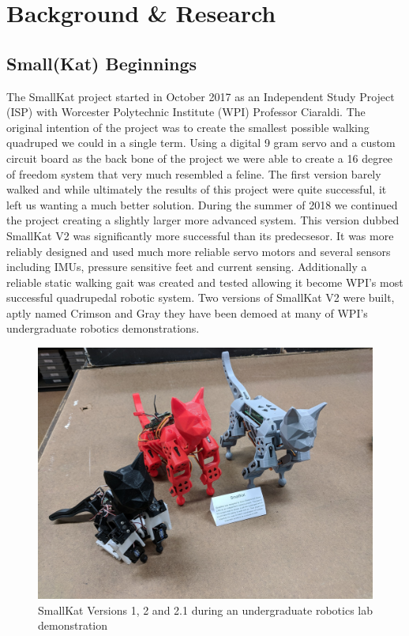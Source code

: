 \graphicspath{ {./figures/} }

\section{Background \& Research}
    \label{chap:background}
    \subsection{Small(Kat) Beginnings}
        The SmallKat project started in October 2017 as an Independent Study Project (ISP) with Worcester Polytechnic Institute (WPI) Professor Ciaraldi. The original intention of the project was to create the smallest possible walking quadruped we could in a single term. Using a digital 9 gram servo and a custom circuit board as the back bone of the project we were able to create a 16 degree of freedom system that very much resembled a feline. The first version barely walked and while ultimately the results of this project were quite successful, it left us wanting a much better solution. During the summer of 2018 we continued the project creating a slightly larger more advanced system. This version dubbed SmallKat V2 was significantly more successful than its predecsesor. It was more reliably designed and used much more reliable servo motors and several sensors including IMUs, pressure sensitive feet and current sensing. Additionally a reliable static walking gait was created and tested allowing it become WPI's most successful quadrupedal robotic system. Two versions of SmallKat V2 were built, aptly named Crimson and Gray they have been demoed at many of WPI's undergraduate robotics demonstrations. 
        
        \begin{figure}[H]
            \centering
            \includegraphics[width=120mm]{figures/V1andV2.jpg}
            \caption{SmallKat Versions 1, 2 and 2.1 during an undergraduate robotics lab demonstration}
            \label{fig:SmallKatVersions}
        \end{figure}
